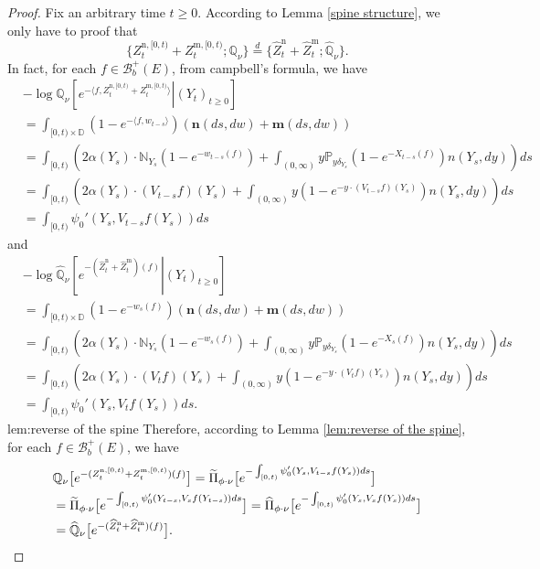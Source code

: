 \documentclass[12pt,a4paper]{amsart}
\theoremstyle{plain}
\theoremstyle{definition}
\numberwithin{equation}{section}
\begin{document}
\begin{proof}
	Fix an arbitrary time $t\geq 0$. According to Lemma \ref{spine structure}, we only have to proof that
\[
	\{Z^{\mathrm n,[0,t)}_{t} + Z^{\mathrm m,[0,t)}_{t}; \mathbb Q_\nu\}
	\overset{d}{=}
	\{\widehat Z^{\mathrm n}_{t} + \widehat Z^{\mathrm m}_{t}; \widehat{\mathbb Q}_\nu\}.
\]
	In fact, for each $f\in \mathcal B_b^+(E)$, from campbell's formula, we have
\begin{align}
	&-\log \mathbb Q_\nu \left [\left. e^{-\langle f, Z^{\mathrm n,[0,t)}_{t} + Z^{\mathrm m,[0,t)}_{t}\rangle}\right |(Y_t)_{t\geq 0}\right]
	\\&= \int_{[0,t)\times \mathbb D} \left(1-e^{- \langle f, w_{t-s}\rangle}\right)\left(\mathbf n(ds,dw) + \mathbf m(ds,dw)\right)
	\\&= \int_{[0,t)} \left(2\alpha(Y_s) \cdot \mathbb N_{Y_s}\left(1-e^{-w_{t-s}(f)}\right) + \int_{(0,\infty)} y \mathbb P_{y\delta_{Y_s}}\left(1-e^{-X_{t-s}(f)}\right)n(Y_s,dy)\right) ds
	\\&= \int_{[0,t)} \left(2\alpha(Y_s) \cdot (V_{t-s}f)(Y_s) + \int_{(0,\infty)} y \left(1-e^{-y\cdot(V_{t-s}f)(Y_s)}\right)n(Y_s,dy)\right) ds
	\\&= \int_{[0,t)} \psi_0'\left( Y_s, V_{t-s}f(Y_s)\right)ds
\end{align}
	and
\begin{align}
	&-\log \widehat{\mathbb Q}_\nu \left [\left. e^{-(\widehat Z^{\mathrm n}_{t} + \widehat Z^{\mathrm m}_{t})(f)}\right |(Y_t)_{t\geq 0}\right]
	\\&= \int_{[0,t)\times \mathbb D} \left(1-e^{- w_s(f)}\right)\left(\mathbf n(ds,dw) + \mathbf m(ds,dw)\right)
	\\&= \int_{[0,t)} \left(2\alpha(Y_s) \cdot \mathbb N_{Y_s}\left(1-e^{-w_{s}(f)}\right) + \int_{(0,\infty)} y \mathbb P_{y\delta_{Y_s}}\left(1-e^{-X_{s}(f)}\right)n(Y_s,dy)\right) ds
	\\&= \int_{[0,t)} \left(2\alpha(Y_s) \cdot (V_{t}f)(Y_s) + \int_{(0,\infty)} y \left(1-e^{-y\cdot(V_{t}f)(Y_s)}\right)n(Y_s,dy)\right) ds
	\\&= \int_{[0,t)} \psi_0'\left( Y_s, V_{t}f(Y_s)\right)ds.
\end{align}
	lem:reverse of the spine
	Therefore, according to Lemma \ref{lem:reverse of the spine}, for each $f\in \mathcal B_b^+(E)$, we have
\begin{align}
  	&\mathbb Q_\nu  \big[e^{-(Z^{\mathrm n,[0,t)}_{t} + Z^{\mathrm m,[0,t)}_{t})(f)}\big]
  	= \widetilde \Pi_{\phi\cdot\nu} \big[e^{-\int_{[0,t)} \psi_0'( Y_s, V_{t-s}f(Y_s))ds}\big]
  	\\&= \widetilde \Pi_{\phi\cdot\nu} \big[e^{-\int_{[0,t)} \psi_0'( Y_{t-s}, V_{s}f(Y_{t-s}))ds}\big]
  	= \widehat \Pi_{\phi\cdot\nu} \big[e^{-\int_{[0,t)} \psi_0'( Y_{s}, V_{s}f(Y_{s}))ds}\big]
  	\\&= \widehat{\mathbb Q}_\nu \big [e^{-(\widehat Z^{\mathrm n}_{t} + \widehat Z^{\mathrm m}_{t})(f)}\big].
  	\qedhere
\end{align}
\end{proof}
\end{document}
